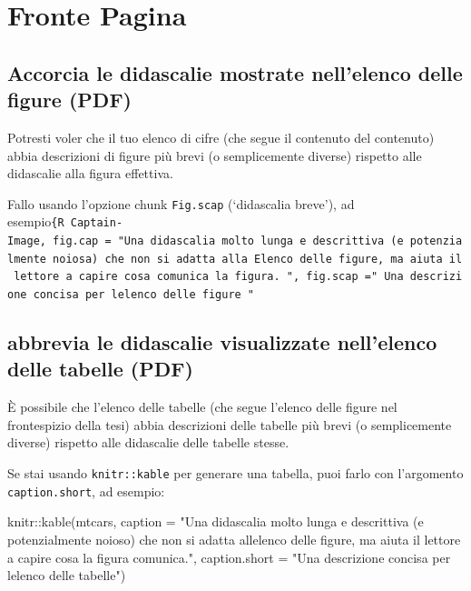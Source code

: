 \documentclass[a4paper, 11pt, nobind]{templates/ociamthesis}
\newenvironment{Shaded}{\begin{snugshade}}{\end{snugshade}}
\newcommand{\AttributeTok}[1]{\textcolor[rgb]{0.77,0.63,0.00}{#1}}
\newcommand{\FunctionTok}[1]{\textcolor[rgb]{0.00,0.00,0.00}{#1}}
\newcommand{\NormalTok}[1]{#1}
\newcommand{\SpecialCharTok}[1]{\textcolor[rgb]{0.00,0.00,0.00}{#1}}
\newcommand{\StringTok}[1]{\textcolor[rgb]{0.31,0.60,0.02}{#1}}
\renewenvironment{Shaded}
{
  \vspace{10pt}%
  \begin{snugshade}%
}{%
  \end{snugshade}%
  \vspace{8pt}%
}
\begin{document}
\hypertarget{fronte-pagina}{%
\section{Fronte Pagina}\label{fronte-pagina}}

\hypertarget{accorcia-le-didascalie-mostrate-nellelenco-delle-figure-pdf}{%
\subsection{Accorcia le didascalie mostrate nell'elenco delle figure (PDF)}\label{accorcia-le-didascalie-mostrate-nellelenco-delle-figure-pdf}}

Potresti voler che il tuo elenco di cifre (che segue il contenuto del contenuto) abbia descrizioni di figure più brevi (o semplicemente diverse) rispetto alle didascalie alla figura effettiva.

Fallo usando l'opzione chunk \texttt{Fig.scap} (`didascalia breve'), ad esempio\texttt{\{R\ Captain-Image,\ fig.cap\ =\ "Una\ didascalia\ molto\ lunga\ e\ descrittiva\ (e\ potenzialmente\ noiosa)\ che\ non\ si\ adatta\ alla\ Elenco\ delle\ figure,\ ma\ aiuta\ il\ lettore\ a\ capire\ cosa\ comunica\ la\ figura.\ ",\ fig.scap\ ="\ Una\ descrizione\ concisa\ per\ l\textquotesingle{}elenco\ delle\ figure\ "}

\hypertarget{abbrevia-le-didascalie-visualizzate-nellelenco-delle-tabelle-pdf}{%
\subsection{abbrevia le didascalie visualizzate nell'elenco delle tabelle (PDF)}\label{abbrevia-le-didascalie-visualizzate-nellelenco-delle-tabelle-pdf}}

È possibile che l'elenco delle tabelle (che segue l'elenco delle figure nel frontespizio della tesi) abbia descrizioni delle tabelle più brevi (o semplicemente diverse) rispetto alle didascalie delle tabelle stesse.

Se stai usando \texttt{knitr::kable} per generare una tabella, puoi farlo con l'argomento \texttt{caption.short}, ad esempio:

\begin{Shaded}
\begin{Highlighting}[]
\NormalTok{knitr}\SpecialCharTok{::}\FunctionTok{kable}\NormalTok{(mtcars,}
              \AttributeTok{caption =} \StringTok{"Una didascalia molto lunga e descrittiva (e potenzialmente}
\StringTok{               noioso) che non si adatta all\textquotesingle{}elenco delle figure,}
\StringTok{               ma aiuta il lettore a capire cosa la figura}
\StringTok{               comunica."}\NormalTok{,}
              \AttributeTok{caption.short =} \StringTok{"Una descrizione concisa per l\textquotesingle{}elenco delle tabelle"}\NormalTok{)}
\end{Highlighting}
\end{Shaded}
\end{document}
